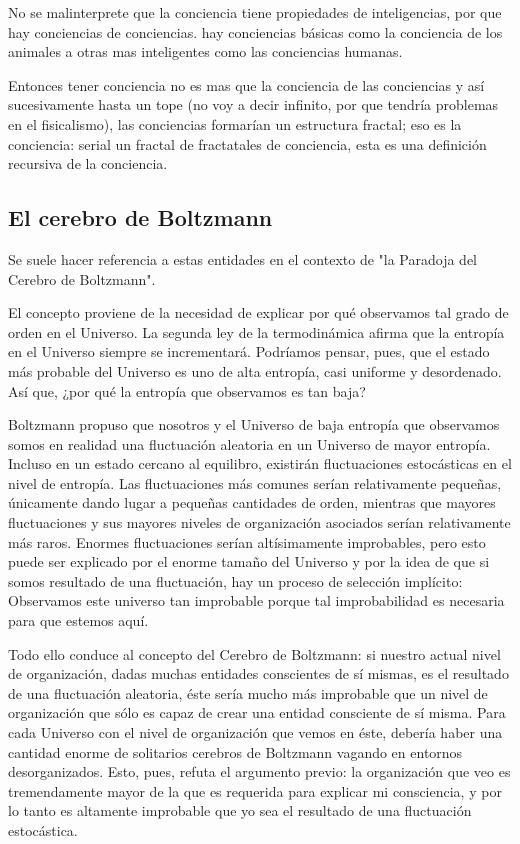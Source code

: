 \documentclass[12pt,letterpaper, a4paper ]{article}
\begin{document}
No se malinterprete que la conciencia tiene propiedades de inteligencias, por que hay conciencias de conciencias. hay conciencias básicas como la conciencia de los animales a otras mas inteligentes como las conciencias humanas.

Entonces tener conciencia no es mas que la conciencia de las conciencias y así sucesivamente hasta un tope (no voy a decir infinito, por que tendría problemas en el fisicalismo), las conciencias formarían un estructura fractal;
eso es la conciencia: serial un fractal de fractatales de conciencia, esta es una definición recursiva de la conciencia.


\subsection{El cerebro de Boltzmann}

Se suele hacer referencia a estas entidades en el contexto de "la Paradoja del Cerebro de Boltzmann".

El concepto proviene de la necesidad de explicar por qué observamos tal grado de orden en el Universo. La segunda ley de la termodinámica afirma que la entropía en el Universo siempre se incrementará. Podríamos pensar, pues, que el estado más probable del Universo es uno de alta entropía, casi uniforme y desordenado. Así que, ¿por qué la entropía que observamos es tan baja?

Boltzmann propuso que nosotros y el Universo de baja entropía que observamos somos en realidad una fluctuación aleatoria en un Universo de mayor entropía. Incluso en un estado cercano al equilibro, existirán fluctuaciones estocásticas en el nivel de entropía. Las fluctuaciones más comunes serían relativamente pequeñas, únicamente dando lugar a pequeñas cantidades de orden, mientras que mayores fluctuaciones y sus mayores niveles de organización asociados serían relativamente más raros. Enormes fluctuaciones serían altísimamente improbables, pero esto puede ser explicado por el enorme tamaño del Universo y por la idea de que si somos resultado de una fluctuación, hay un proceso de selección implícito: Observamos este universo tan improbable porque tal improbabilidad es necesaria para que estemos aquí.

Todo ello conduce al concepto del Cerebro de Boltzmann: si nuestro actual nivel de organización, dadas muchas entidades conscientes de sí mismas, es el resultado de una fluctuación aleatoria, éste sería mucho más improbable que un nivel de organización que sólo es capaz de crear una entidad consciente de sí misma. Para cada Universo con el nivel de organización que vemos en éste, debería haber una cantidad enorme de solitarios cerebros de Boltzmann vagando en entornos desorganizados. Esto, pues, refuta el argumento previo: la organización que veo es tremendamente mayor de la que es requerida para explicar mi consciencia, y por lo tanto es altamente improbable que yo sea el resultado de una fluctuación estocástica.
\end{document}
